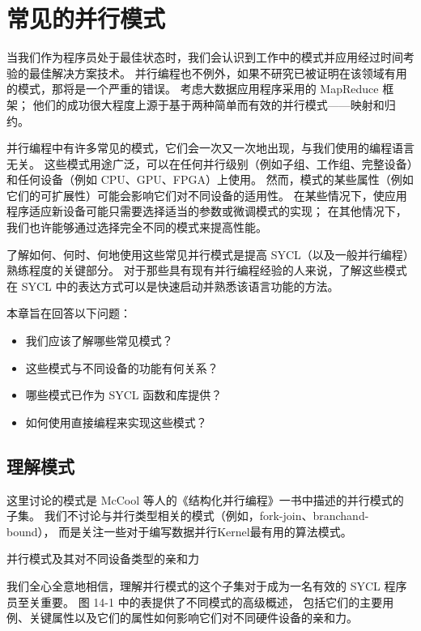 \section{常见的并行模式}
当我们作为程序员处于最佳状态时，我们会认识到工作中的模式并应用经过时间考验的最佳解决方案技术。 
并行编程也不例外，如果不研究已被证明在该领域有用的模式，那将是一个严重的错误。 
考虑大数据应用程序采用的 MapReduce 框架； 他们的成功很大程度上源于基于两种简单而有效的并行模式——映射和归约。

并行编程中有许多常见的模式，它们会一次又一次地出现，与我们使用的编程语言无关。 
这些模式用途广泛，可以在任何并行级别（例如子组、工作组、完整设备）和任何设备（例如 CPU、GPU、FPGA）上使用。 
然而，模式的某些属性（例如它们的可扩展性）可能会影响它们对不同设备的适用性。 
在某些情况下，使应用程序适应新设备可能只需要选择适当的参数或微调模式的实现； 
在其他情况下，我们也许能够通过选择完全不同的模式来提高性能。

了解如何、何时、何地使用这些常见并行模式是提高 SYCL（以及一般并行编程）熟练程度的关键部分。 
对于那些具有现有并行编程经验的人来说，了解这些模式在 SYCL 中的表达方式可以是快速启动并熟悉该语言功能的方法。

本章旨在回答以下问题：

\begin{itemize}
	\item 我们应该了解哪些常见模式？

	\item 这些模式与不同设备的功能有何关系？

	\item 哪些模式已作为 SYCL 函数和库提供？

	\item 如何使用直接编程来实现这些模式？
\end{itemize}


\subsection{理解模式}
这里讨论的模式是 McCool 等人的《结构化并行编程》一书中描述的并行模式的子集。 
我们不讨论与并行类型相关的模式（例如，fork-join、branchand-bound），
而是关注一些对于编写数据并行Kernel最有用的算法模式。

{\color{red} 并行模式及其对不同设备类型的亲和力}

我们全心全意地相信，理解并行模式的这个子集对于成为一名有效的 SYCL 程序员至关重要。 
图 14-1 中的表提供了不同模式的高级概述，
包括它们的主要用例、关键属性以及它们的属性如何影响它们对不同硬件设备的亲和力。

